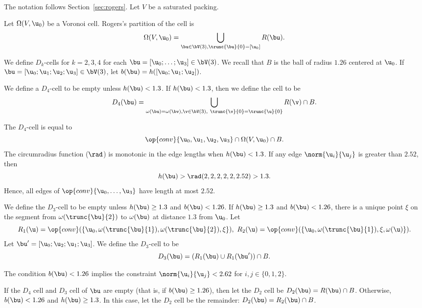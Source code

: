 The notation follows Section~\ref{sec:rogers}.  Let $V$ be a saturated
packing.

Let $\Omega( V,\u_0)$ be a Voronoi cell.  Rogers's partition of the cell
is
\[
\Omega(V, \u_0) = \bigcup_{ \bu\in  \bV(3), \trunc{\bu}{0}= [\u_0] } R( \bu).
\]
%
%


We define $D_k$-cells for $k=2,3,4$ for each $ \bu=[\u_0;\ldots;\u_3]\in
\bV(3)$.  We recall that $B$ is the ball of radius $1.26$ centered at $
\u_0$.  If $\bu =[\u_0;\u_1;\u_2;\u_3]\in \bV(3)$, let $b(\bu) = h([
\u_0; \u_1; \u_2])$.  %
%

\begin{definition}[$D_4$]
  We define a $D_4$-cell to be empty unless $h(\bu)<1.3$.  If
  $h(\bu)<1.3$, then we define the cell to be
\[
  D_4(\bu)=\bigcup_{\omega( \bu)
=\omega(\bv),  \v\in  \bV(3),\ \trunc{\v}{0}= \trunc{\u}{0}}  R(\v)\cap B.
\]
%
\end{definition}

The $D_4$-cell is equal to
\[
  \op{conv}\{ \u_0, \u_1, \u_2, \u_3\} \cap \Omega(V, \u_0)\cap B.
\]
The circumradius function ($\rad$) is monotonic in the edge lengths
when $h(\bu)<1.3$.  If any edge $\norm{ \u_i}{ \u_j}$ is greater than
$2.52$, then
\[
h(\bu) > \rad(2,2,2,2,2,2.52) > 1.3.
\]  
Hence, all edges of $\op{conv}\{\u_0,\ldots,\u_3\}$ have length at most
$2.52$.

\begin{definition}[$D_3$]
  We define the $D_3$-cell to be empty unless $h(\bu)\ge 1.3$ and
  $b(\bu)< 1.26$.  If $h(\bu) \ge 1.3$ and $b(\bu)< 1.26$, there is a
  unique point $\xi$ on the segment from $\omega( \trunc{\bu}{2})$ to
  $\omega(\bu)$ at distance  $1.3$ from $ \u_0$.  Let
\[
  R_1( \u) = \op{conv}(\{ \u_0,\omega( \trunc{\bu}{1}),\omega( \trunc{\bu}{2}),\xi\} ),\ 
  R_2( \u) = \op{conv}(\{ \u_0,\omega( \trunc{\bu}{1}),\xi,\omega( \u)\} ).
\]
Let $ \bu' = [ \u_0; \u_2; \u_1; \u_3]$.
We define the $D_3$-cell to be
\[
D_3(\bu) = (R_1( \bu) \cup R_1( \bu'))\cap B.
\]
\end{definition}

The condition $b(\bu)< 1.26$ implies the constraint $\norm{ \u_i}{
  \u_j}< 2.62$ for $i,j\in\{0,1,2\}$.

\begin{definition}[$D_2$]
  If the $D_4$ cell and $D_3$ cell of $\bu$ are empty (that is, if
  $b(\bu)\ge 1.26$), then let the $D_2$ cell be $D_2(\bu)=R(\bu)\cap
  B$.  Otherwise, $b(\bu)< 1.26$ and $h(\bu) \ge 1.3$.  In this case,
  let the $D_2$ cell be the remainder: $D_2(\bu)=R_2(\bu)\cap B$.
\end{definition}

